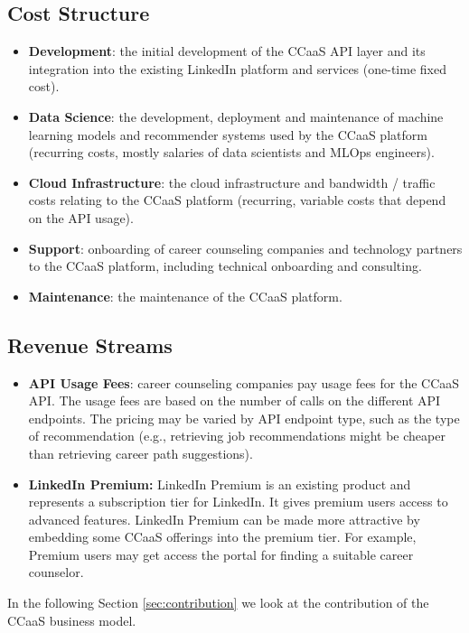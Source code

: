 \subsection{Cost Structure}

\begin{itemize}
    \item \textbf{Development}: the initial development of the CCaaS API layer and its integration into the
            existing LinkedIn platform and services (one-time fixed cost). 
    \item \textbf{Data Science}: the development, deployment and maintenance of machine learning
        models and recommender systems used by the CCaaS platform (recurring costs, mostly salaries 
        of data scientists and MLOps engineers).
    \item \textbf{Cloud Infrastructure}: the cloud infrastructure and bandwidth / traffic costs 
        relating to the CCaaS platform (recurring, variable costs that depend on the API usage).
    \item \textbf{Support}: onboarding of career counseling companies and technology partners
        to the CCaaS platform, including technical onboarding and consulting.
    \item \textbf{Maintenance}: the maintenance of the CCaaS platform.
\end{itemize}

\subsection{Revenue Streams}

\begin{itemize}
    \item \textbf{API Usage Fees}: career counseling companies pay usage fees for the CCaaS API.
        The usage fees are based on the number of calls on the different API endpoints. The pricing
        may be varied by API endpoint type, such as the type of recommendation (e.g., retrieving
        job recommendations might be cheaper than retrieving career path suggestions).
     \item \textbf{LinkedIn Premium:} LinkedIn Premium is an existing product and represents a subscription
        tier for LinkedIn. It gives premium users  access to advanced features. LinkedIn Premium can be made
        more attractive by embedding some CCaaS offerings into the premium tier. For example, Premium
        users may get access the portal for finding a suitable career counselor. 
\end{itemize}


\noindent In the following Section \ref{sec:contribution} we look at the contribution of the CCaaS business
model.
